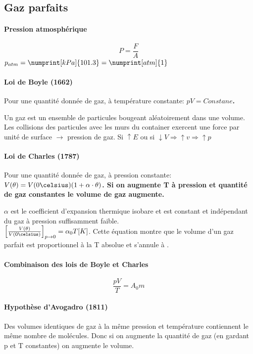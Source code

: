 \documentclass[11pt,a4paper,french]{article}
\renewcommand{\textbf}[1]{\begingroup\bfseries\mathversion{bold}#1\endgroup}
\begin{document}
\subsection{Gaz parfaits}

\paragraph{Pression atmosphérique}
$$P=\frac{F}{A}$$ $p_{atm}=\numprint[kPa]{101.3}=\numprint[atm]{1}$

\paragraph{Loi de Boyle (1662)}
Pour une quantité donnée de gaz, à température constante: \textbf{$pV = Constane$}.

Un gaz est un ensemble de particules bougeant aléatoirement dans une volume.
Les collisions des particules avec les murs du container exercent une force par unité de surface $\rightarrow$ pression de gaz.
Si $\uparrow E$ ou si $\downarrow V \Rightarrow \uparrow v \Rightarrow \uparrow p$

\paragraph{Loi de Charles (1787)}
Pour une quantité donnée de gaz, à pression constante: \textbf{$V(\theta)=V(0\celsius)(1+\alpha\cdot \theta)$}.
Si on augmente T à pression et quantité de gaz constantes le volume de gaz augmente.

$\alpha$ est le coefficient d'expansion thermique isobare et est constant et indépendant du gaz à pression suffisamment faible.\\

$\left[\frac{V(\theta)}{V(0\celsius)}\right]_{p\rightarrow0}=\alpha_0T[K]$.
Cette équation montre que le volume d'un gaz parfait est proportionnel à la T absolue et s'annule à .

\paragraph{Combinaison des lois de Boyle et Charles}
$$\frac{pV}{T}=A_0m$$

\paragraph{Hypothèse d'Avogadro (1811)}
Des volumes identiques de gaz à la même pression et température contiennent le même nombre de molécules.
Donc si on augmente la quantité de gaz (en gardant p et T constantes) on augmente le volume.
\end{document}

